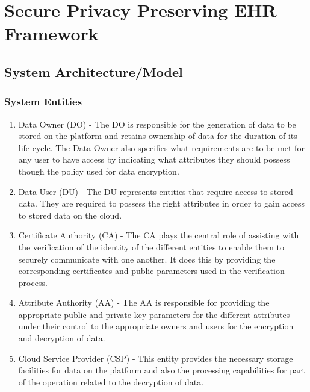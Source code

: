 \section{Secure Privacy Preserving EHR Framework}


\subsection{System Architecture/Model}

\subsubsection{System Entities}

\begin{enumerate}[label=(\arabic*)]
	\item Data Owner (DO) - The DO is responsible for the generation of data to be stored on the platform and retains ownership of data for the duration of its life cycle. The Data Owner also specifies what requirements are to be met for any user to have access by indicating what attributes they should possess though the policy used for data encryption.
	
	\item Data User (DU) - The DU represents entities that require access to stored data. They are required to possess the right attributes in order to gain access to stored data on the cloud.
	
	\item Certificate Authority (CA) - The CA plays the central role of assisting with the verification of the identity of the different entities to enable them to securely communicate with one another. It does this by providing the corresponding certificates and public parameters used in the verification process.
	
	\item Attribute Authority (AA) - The AA is responsible for providing the appropriate public and private key parameters for the different attributes under their control to the appropriate owners and users for the encryption and decryption of data. 
	
	\item Cloud Service Provider (CSP) - This entity provides the necessary storage facilities for data on the platform and also the processing capabilities for part of the operation related to the decryption of data.
	
\end{enumerate}

